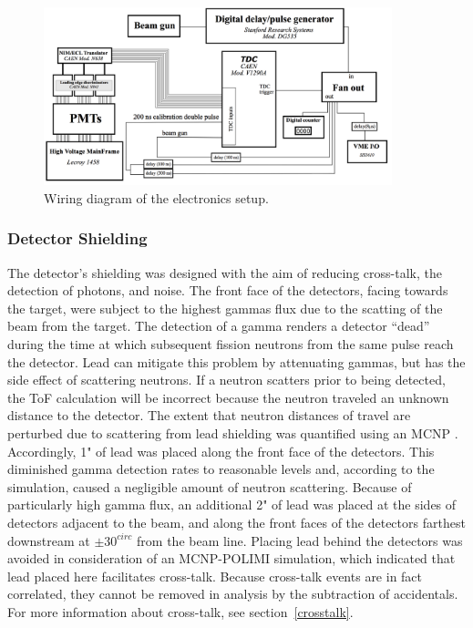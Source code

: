 \begin{figure}[h]
\includegraphics[width=0.9\textwidth]{Content/Methods/WiringDiagram.png}
\caption{Wiring diagram of the electronics setup. }
\label{fig:WiringDiagram}
\end{figure}

\subsubsection{Detector Shielding}
The detector's shielding was designed with the aim of reducing cross-talk, the detection of photons, and noise.
The front face of the detectors, facing towards the target, were subject to the highest gammas flux due to the scatting of the beam from the target.
The detection of a gamma renders a detector ``dead'' during the time at which subsequent fission neutrons from the same pulse reach the detector.
Lead can mitigate this problem by attenuating gammas, but has the side effect of scattering neutrons.
If a neutron scatters prior to being detected, the ToF calculation will be incorrect because the neutron traveled an unknown distance to the detector.
The extent that neutron distances of travel are perturbed due to scattering from lead shielding was quantified using an MCNP .
Accordingly, 1" of lead was placed along the front face of the detectors.
This diminished gamma detection rates to reasonable levels and, according to the simulation, caused a negligible amount of neutron scattering.
Because of particularly high gamma flux, an additional 2" of lead was placed at the sides of detectors adjacent to the beam, and along the front faces of the detectors farthest downstream at $\pm30^{circ}$ from the beam line.
Placing lead behind the detectors was avoided in consideration of an MCNP-POLIMI simulation, which indicated that lead placed here facilitates cross-talk.
Because cross-talk events are in fact correlated, they cannot be removed in analysis by the subtraction of accidentals.
For more information about cross-talk, see section~\ref{crosstalk}.

